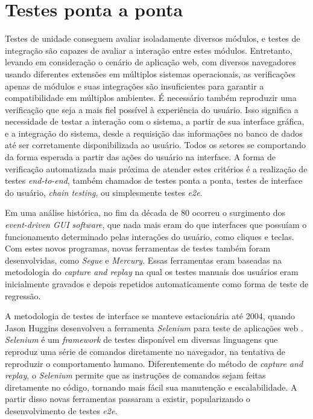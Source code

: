 \hypertarget{testes-ponta-a-ponta}{%
\section{\texorpdfstring{Testes ponta a ponta}{Testes ponta a ponta}}\label{testes-ponta-a-ponta}}

Testes de unidade conseguem avaliar isoladamente diversos módulos, e testes de integração são capazes de avaliar a interação entre estes módulos. Entretanto, levando em consideração o cenário de aplicação web, com diversos navegadores usando diferentes extensões em múltiplos sistemas operacionais, as verificações apenas de módulos e suas integrações são insuficientes para garantir a compatibilidade em múltiplos ambientes. É necessário também reproduzir uma verificação que seja a mais fiel possível à experiência do usuário. Isso significa a necessidade de testar a interação com o sistema, a partir de sua interface gráfica, e a integração do sistema, desde a requisição das informações no banco de dados até ser corretamente disponibilizada ao usuário. Todos os setores se comportando da forma esperada a partir das ações do usuário na interface. A forma de verificação automatizada mais próxima de atender estes critérios é a realização de testes \emph{end-to-end}, também chamados de testes ponta a ponta, testes de interface do usuário, \emph{chain testing}, ou simplesmente testes \emph{e2e}.

Em uma análise histórica, no fim da década de 80 ocorreu o surgimento dos \emph{event-driven GUI software}, que nada mais eram do que interfaces que possuíam o funcionamento determinado pelas interações do usuário, como cliques e teclas. Com estes novos programas, novas ferramentas de testes também foram desenvolvidas, como \emph{Segue} e \emph{Mercury}. Essas ferramentas eram baseadas na metodologia do \emph{capture and replay} na qual os testes manuais dos usuários eram inicialmente gravados e depois repetidos automaticamente como forma de teste de regressão.

A metodologia de testes de interface se manteve estacionária até 2004, quando Jason Huggins desenvolveu a ferramenta \emph{Selenium} para teste de aplicações web \cite{brown}. \emph{Selenium} é um \emph{framework} de testes disponível em diversas linguagens que reproduz uma série de comandos diretamente no navegador, na tentativa de reproduzir o comportamento humano. Diferentemente do método de \emph{capture and replay}, o \emph{Selenium} permite que as instruções de comandos sejam feitas diretamente no código, tornando mais fácil sua manutenção e escalabilidade. A partir disso novas ferramentas passaram a existir, popularizando o desenvolvimento de testes \emph{e2e}.

